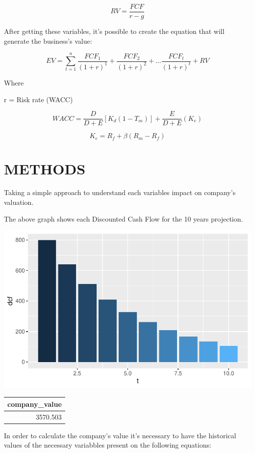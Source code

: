 \documentclass[
  11pt,
  a4paper,
]{article}
\begin{document}
\[RV = \frac{FCF}{r-g}\]

After getting these variables, it's possible to create the equation that will generate the business's value:

\[EV = \sum_{t=1}^n\frac{FCF_1}{(1+r)^1} + \frac{FCF_2}{(1+r)^2} + ... \frac{FCF_t}{(1+r)^t} + RV \]

Where

r = Risk rate (WACC)

\[WACC = \frac{D}{D+E}[K_d(1-T_m)]+\frac{E}{D+E}(K_e)\]

\[K_e = R_f+\beta(R_m - R_f)\]

\hypertarget{methods}{%
\section{METHODS}\label{methods}}

Taking a simple approach to understand each variables impact on company's valuation.

The above graph shows each Discounted Cash Flow for the 10 years projection.

\begin{center}\includegraphics{output/figures/unnamed-chunk-2-1} \end{center}

\begin{tabular}{r}
\hline
company\_value\\
\hline
3570.503\\
\hline
\end{tabular}

In order to calculate the company's value it's necessary to have the historical values of the necessary variabbles present on the following equations:
\end{document}
